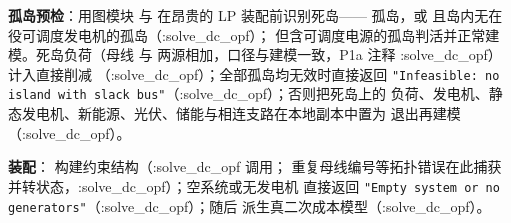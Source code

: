 \textbf{孤岛预检}：用图模块  与
 在昂贵的 LP 装配前识别死岛——
孤岛，或  且岛内无在役可调度发电机的孤岛（:solve\_dc\_opf）；
 但含可调度电源的孤岛判活并正常建模。死岛负荷（母线  与
 两源相加，口径与建模一致，P1a 注释 :solve\_dc\_opf）计入直接削减
（:solve\_dc\_opf）；全部孤岛均无效时直接返回
\texttt{"Infeasible: no island with slack bus"}（:solve\_dc\_opf）；否则把死岛上的
负荷、发电机、静态发电机、新能源、光伏、储能与相连支路在本地副本中置为
退出再建模（:solve\_dc\_opf）。

\textbf{装配}： 构建约束结构（:solve\_dc\_opf 调用；
重复母线编号等拓扑错误在此捕获并转状态，:solve\_dc\_opf）；空系统或无发电机
直接返回 \texttt{"Empty system or no generators"}（:solve\_dc\_opf）；随后
 派生真二次成本模型（:solve\_dc\_opf）。

